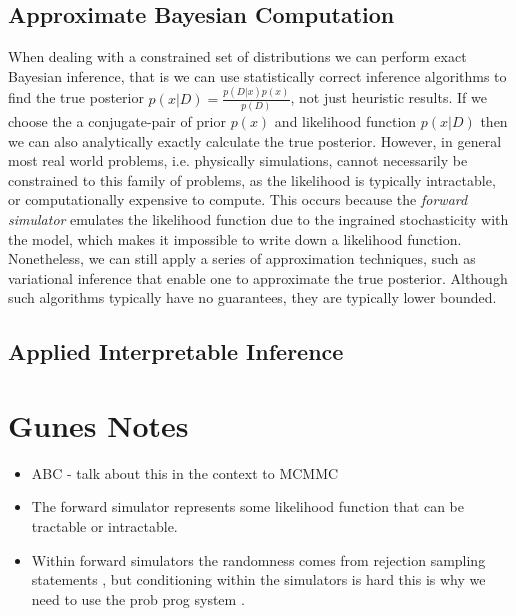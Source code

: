 \documentclass[]{scrartcl}
\begin{document}


\subsection{Approximate Bayesian Computation}

When dealing with a constrained set of distributions we can perform exact Bayesian inference, that is we can use statistically correct inference algorithms to find the true posterior $p(x | D) = \frac{p(D|x)p(x)}{p(D)}$, not just heuristic results. If we choose the a conjugate-pair of prior $p(x)$ and likelihood function $p(x|D)$ then we can also analytically exactly calculate the true posterior. However, in general most real world problems, i.e. physically simulations, cannot necessarily be constrained to this family of problems, as the likelihood is typically intractable, or computationally expensive to compute. This occurs because the \textit{forward simulator} emulates the likelihood function
due to the ingrained stochasticity with the model, which makes it impossible to write down a likelihood function. Nonetheless, we can still apply a series of approximation techniques, such as variational inference that enable one to approximate the true posterior. Although such algorithms typically have no guarantees, they are typically lower bounded.   

\subsection{Applied Interpretable Inference}


\section{Gunes Notes}
\begin{itemize}
	\item ABC - talk about this in the context to MCMMC
	\item The forward simulator represents some likelihood function that can be tractable or intractable. 
	\item Within forward simulators the randomness comes from rejection sampling statements , but conditioning within the simulators is hard
this is why we need to use the prob prog system . 
\end{itemize}
\end{document}

